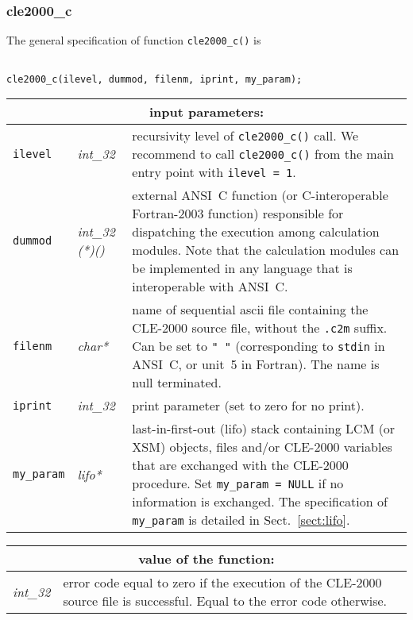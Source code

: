 \subsubsection{cle2000\_c}

The general specification of function {\tt cle2000\_c()} is

\begin{verbatim}

cle2000_c(ilevel, dummod, filenm, iprint, my_param);
\end{verbatim}

\vskip 0.8cm

\noindent
\begin{tabular}{|p{1.5cm}|p{2cm}|p{11cm}|}
\hline
\multicolumn{3}{|c|}{\bf input parameters:} \\
\hline
{\tt ilevel} & {\it int\_32} & recursivity level of {\tt cle2000\_c()} call. We recommend to call
{\tt cle2000\_c()} from the main entry point with {\tt ilevel = 1}. \\
\hline
{\tt dummod} & {\it int\_32 (*)()} & external ANSI~C function (or C-interoperable Fortran-2003 function) responsible for dispatching the execution among calculation modules. Note that the calculation modules can be implemented in any language that is interoperable with ANSI~C. \\
\hline
{\tt filenm} & {\it char*} & name of sequential {\sc ascii} file containing the CLE-2000 source file, without the {\tt .c2m} suffix. Can be set to {\tt " "} (corresponding to {\tt stdin} in ANSI~C, or unit~5 in Fortran). The name is null terminated. \\
\hline
{\tt iprint} & {\it int\_32} & print parameter (set to zero for no print). \\
\hline
{\tt my\_param} & {\it lifo*} & last-in-first-out (lifo) stack containing LCM (or XSM) objects, files and/or CLE-2000 variables that are exchanged with the CLE-2000 procedure. Set {\tt my\_param = NULL} if  no information is exchanged. The specification of {\tt my\_param} is detailed in Sect.~\ref{sect:lifo}. \\
\hline
\end{tabular}

\vskip 0.4cm

\noindent
\begin{tabular}{|p{4.0cm}|p{11cm}|}
\hline
\multicolumn{2}{|c|}{\bf value of the function:} \\
\hline
{\it int\_32} & error code equal to zero if the execution of the CLE-2000 source file is successful. Equal to the error code otherwise. \\
\hline
\end{tabular}

